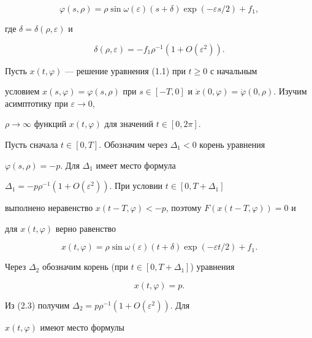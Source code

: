 $$


\varphi(s,\rho)=


\rho\sin\omega(\varepsilon)(s+\delta)\exp(- \varepsilon s/2) + f_1,


$$


где $\delta= \delta(\rho,\varepsilon)$ и


$$


\delta(\rho,\varepsilon) = -f_1\rho^{-1}(1+O(\varepsilon^2)).


$$


Пусть $x(t,\varphi)$ --- решение уравнения (1.1) при $t\ge0$ с начальным


условием $x(s, \varphi)=\varphi(s,\rho)$ при $s\in[-T,0]$ и $\Dot


x(0,\varphi)=\Dot\varphi(0,\rho)$. Изучим асимптотику при $\varepsilon\to0$,


$\rho\to\infty$ функций $x(t, \varphi)$ для значений $t\in[0, 2\pi]$.





Пусть сначала $t\in[0,T]$. Обозначим через $\Delta_1<0$ корень уравнения


$\varphi(s,\rho)=-p$. Для $\Delta_1$ имеет место формула


$\Delta_1=-p\rho^{-1}(1+O(\varepsilon^2))$. При условии $t\in[0,T+\Delta_1]$


выполнено неравенство $x(t-T,\varphi)<-p$, поэтому $F(x(t-T,\varphi))=0$ и


для $x(t,\varphi)$ верно равенство


\begin{equation}


x(t,\varphi)=\rho\sin\omega(\varepsilon)(t+\delta)\exp(-\varepsilon t/2)+f_1.


\end{equation}


Через $\Delta_2$ обозначим корень (при $t\in[0,T+\Delta_1]$) уравнения


\begin{equation}


x(t,\varphi)=p.


\end{equation}


Из (2.3) получим $\Delta_2=p\rho^{-1}(1+O(\varepsilon^2))$. Для


$x(t,\varphi)$ имеют место формулы


